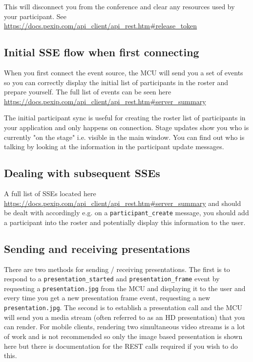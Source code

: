 \documentclass[a4paper,11pt]{article}
\begin{document}
This will disconnect you from the conference and clear any resources
used by your participant.  See
\url{https://docs.pexip.com/api\_client/api\_rest.htm\#release\_token}

\subsection{Initial SSE flow when first connecting}
\label{sec:org8e33d8b}

\label{org5c84b16}

When you first connect the event source, the MCU will send you a set
of events so you can correctly display the initial list of
participants in the roster and prepare yourself.  The full list of events
can be seen here
\url{https://docs.pexip.com/api\_client/api\_rest.htm\#server\_summary}

The initial participant sync is useful for creating the roster list of
participants in your application and only happens on connection.
Stage updates show you who is currently "on the stage" i.e. visible in
the main window.  You can find out who is talking by looking at the
information in the participant update messages.

\subsection{Dealing with subsequent SSEs}
\label{sec:org81383f1}

A full list of SSEs located here
\url{https://docs.pexip.com/api\_client/api\_rest.htm\#server\_summary} and
should be dealt with accordingly e.g. on a \texttt{participant\_create}
message, you should add a participant into the roster and potentially
display this information to the user.

\subsection{Sending and receiving presentations}
\label{sec:orgd9026f5}

There are two methods for sending / receiving presentations.  The
first is to respond to a \texttt{presentation\_started} and
\texttt{presentation\_frame} event by requesting a \texttt{presentation.jpg} from the
MCU and displaying it to the user and every time you get a new
presentation frame event, requesting a new \texttt{presentation.jpg}.  The
second is to establish a presentation call and the MCU will send you a
media stream (often referred to as an HD presentation) that you can
render.  For mobile clients, rendering two simultaneous video streams
is a lot of work and is not recommended so only the image based
presentation is shown here but there is documentation for the REST
calls required if you wish to do this.
\end{document}
